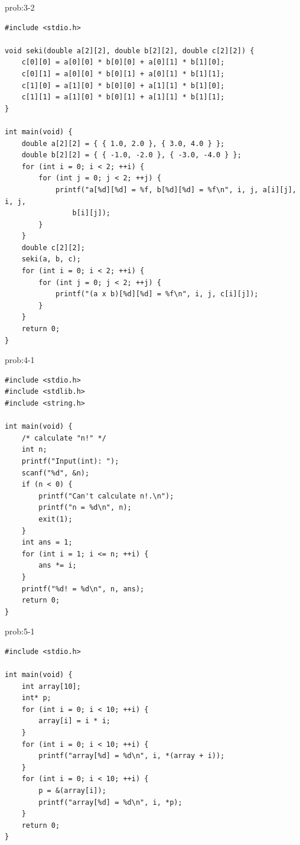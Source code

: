 \begin{renshuu-answer}{prob:3-2}
\baselineskip=12pt
\begin{verbatim}
#include <stdio.h>

void seki(double a[2][2], double b[2][2], double c[2][2]) {
    c[0][0] = a[0][0] * b[0][0] + a[0][1] * b[1][0];
    c[0][1] = a[0][0] * b[0][1] + a[0][1] * b[1][1];
    c[1][0] = a[1][0] * b[0][0] + a[1][1] * b[1][0];
    c[1][1] = a[1][0] * b[0][1] + a[1][1] * b[1][1];
}

int main(void) {
    double a[2][2] = { { 1.0, 2.0 }, { 3.0, 4.0 } };
    double b[2][2] = { { -1.0, -2.0 }, { -3.0, -4.0 } };
    for (int i = 0; i < 2; ++i) {
        for (int j = 0; j < 2; ++j) {
            printf("a[%d][%d] = %f, b[%d][%d] = %f\n", i, j, a[i][j], i, j,
                b[i][j]);
        }
    }
    double c[2][2];
    seki(a, b, c);
    for (int i = 0; i < 2; ++i) {
        for (int j = 0; j < 2; ++j) {
            printf("(a x b)[%d][%d] = %f\n", i, j, c[i][j]);
        }
    }
    return 0;
}
\end{verbatim}
\end{renshuu-answer}
\begin{renshuu-answer}{prob:4-1}
\baselineskip=12pt
\begin{verbatim}
#include <stdio.h>
#include <stdlib.h>
#include <string.h>

int main(void) {
    /* calculate "n!" */
    int n;
    printf("Input(int): ");
    scanf("%d", &n);
    if (n < 0) {
        printf("Can't calculate n!.\n");
        printf("n = %d\n", n);
        exit(1);
    }
    int ans = 1;
    for (int i = 1; i <= n; ++i) {
        ans *= i;
    }
    printf("%d! = %d\n", n, ans);
    return 0;
}
\end{verbatim}
\end{renshuu-answer}
\begin{renshuu-answer}{prob:5-1}
\baselineskip=12pt
\begin{verbatim}
#include <stdio.h>

int main(void) {
    int array[10];
    int* p;
    for (int i = 0; i < 10; ++i) {
        array[i] = i * i;
    }
    for (int i = 0; i < 10; ++i) {
        printf("array[%d] = %d\n", i, *(array + i));
    }
    for (int i = 0; i < 10; ++i) {
        p = &(array[i]);
        printf("array[%d] = %d\n", i, *p);
    }
    return 0;
}
\end{verbatim}
\end{renshuu-answer}
